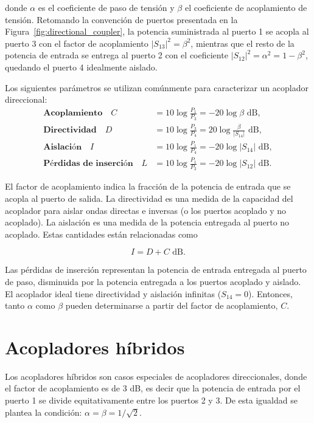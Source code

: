 \vspace{-0.5cm}

donde $\alpha$ es el coeficiente de paso de tensión y $\beta$ el coeficiente de acoplamiento de tensión. Retomando la convención de puertos presentada en la Figura~\ref{fig:directional_coupler}, la potencia suministrada al puerto 1 se acopla al puerto 3 con el factor de acoplamiento $|S_{13}|^2 = \beta^2$, mientras que el resto de la potencia de entrada se entrega al puerto 2 con el coeficiente $|S_{12}|^2 = \alpha^2 = 1 - \beta^2$, quedando el puerto 4 idealmente aislado.

Los siguientes parámetros se utilizan comúnmente para caracterizar un acoplador direccional:
\begingroup
    \allowdisplaybreaks
    \begin{align}
        \textbf{Acoplamiento} \quad C &= 10 \log \frac{P_1}{P_3} = -20 \log \beta \text{ dB}, \label{eq:coupling} \\
        \textbf{Directividad} \quad D &= 10 \log \frac{P_3}{P_4} = 20 \log \frac{\beta}{|S_{14}|} \text{ dB}, \label{eq:directivity} \\
        \textbf{Aislación} \quad I &= 10 \log \frac{P_1}{P_4} = -20 \log |S_{14}| \text{ dB}, \label{eq:isolation} \\
        \textbf{Pérdidas de inserción} \quad L &= 10 \log \frac{P_1}{P_2} = -20 \log |S_{12}| \text{ dB}. \label{eq:insertion_loss}
    \end{align}
\endgroup

El factor de acoplamiento indica la fracción de la potencia de entrada que se acopla al puerto de salida. La directividad es una medida de la capacidad del acoplador para aislar ondas directas e inversas (o los puertos acoplado y no acoplado). La aislación es una medida de la potencia entregada al puerto no acoplado. Estas cantidades están relacionadas como

\begin{equation}
    I = D + C \text{ dB}. \label{eq:relation}
\end{equation}

Las pérdidas de inserción representan la potencia de entrada entregada al puerto de paso, disminuida por la potencia entregada a los puertos acoplado y aislado. El acoplador ideal tiene directividad y aislación infinitas ($S_{14} = 0$). Entonces, tanto $\alpha$ como $\beta$ pueden determinarse a partir del factor de acoplamiento, $C$.

\section{Acopladores híbridos}
Los acopladores híbridos son casos especiales de acopladores direccionales, donde el factor de acoplamiento es de 3 dB, es decir que la potencia de entrada por el puerto 1 se divide equitativamente entre los puertos 2 y 3. De esta igualdad se plantea la condición: $\alpha = \beta = 1/\sqrt{2}$. 

